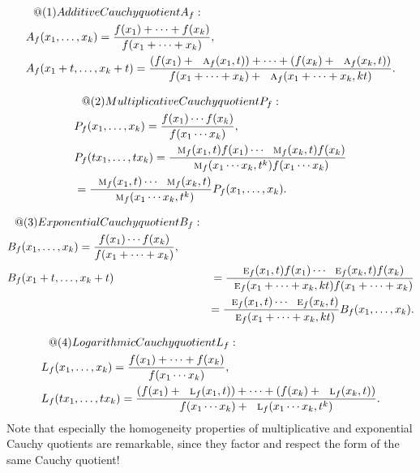 \documentclass{amsart}
\makeatletter
\theoremstyle{plain}
\numberwithin{equation}{section}
\def\RIfM@{\relax\ifmmode}%
\def\RIfM@{\relax\protect\ifmmode}
\def\text{\RIfM@\expandafter\text@\else\expandafter\mbox\fi}
\def\text@#1{\mathchoice
   {\textdef@\displaystyle\f@size{#1}}%
   {\textdef@\textstyle\tf@size{\firstchoice@false #1}}%
   {\textdef@\textstyle\sf@size{\firstchoice@false #1}}%
   {\textdef@\textstyle \ssf@size{\firstchoice@false #1}}%
   \glb@settings}
\def\textdef@#1#2#3{\hbox{{%
                    \everymath{#1}%
                    \let\f@size#2\selectfont
                    #3}}}
\newif\iffirstchoice@
\newcommand{\eh}{\textsc{e}}
\makeatother
\begin{document}
\medskip

\begin{align*}
&\text{(1) Additive Cauchy quotient } A_f: \\
&A_f(x_1, \ldots, x_k) = \frac{f(x_1) + \cdots + f(x_k)}{f(x_1 + \cdots + x_k)}, \\
&A_f(x_1 + t, \ldots, x_k + t) = \frac{(f(x_1) + \textsc{a}_f(x_1,t)) + \cdots + (f(x_k) + \textsc{a}_f(x_k,t))}
       {f(x_1 + \cdots + x_k) + \textsc{a}_f(x_1 + \cdots + x_k, k t)}.
\end{align*}

\medskip

\begin{align*}
&\text{(2) Multiplicative Cauchy quotient } P_f: \\
&P_f(x_1, \ldots, x_k) = \frac{f(x_1) \cdots f(x_k)}{f(x_1 \cdots x_k)}, \\
&P_f(t x_1, \ldots, t x_k) = \frac{\textsc{m}_f(x_1, t) f(x_1) \cdots \textsc{m}_f(x_k, t) f(x_k)}{\textsc{m}_f(x_1 \cdots x_k, t^k) f(x_1 \cdots x_k)} \\
&= \frac{\textsc{m}_f(x_1,t) \cdots \textsc{m}_f(x_k,t)}{\textsc{m}_f(x_1 \cdots x_k, t^k)} P_f(x_1, \ldots, x_k).
\end{align*}

\medskip

\begin{align*}
&\text{(3) Exponential Cauchy quotient } B_f: \\
&B_f(x_1, \ldots, x_k) = \frac{f(x_1) \cdots f(x_k)}{f(x_1 + \cdots + x_k)}, \\
&B_f(x_1 + t, \ldots, x_k + t) &= \frac{\eh_f(x_1,t) f(x_1) \cdots \eh_f(x_k,t) f(x_k)}{\eh_f(x_1 + \cdots + x_k, k t) f(x_1 + \cdots + x_k)} \\
&\quad &= \frac{\eh_f(x_1,t) \cdots \eh_f(x_k,t)}{\eh_f(x_1 + \cdots + x_k, k t)} B_f(x_1, \ldots, x_k).
\end{align*}

\medskip

\begin{align*}
&\text{(4) Logarithmic Cauchy quotient } L_f: \\
&L_f(x_1, \ldots, x_k) = \frac{f(x_1) + \cdots + f(x_k)}{f(x_1 \cdots x_k)}, \\
&L_f(t x_1, \ldots, t x_k) = \frac{(f(x_1) + \textsc{l}_f(x_1,t)) + \cdots + (f(x_k) + \textsc{l}_f(x_k,t))}
       {f(x_1 \cdots x_k) + \textsc{l}_f(x_1 \cdots x_k, t^k)}.
\end{align*}
%
Note that especially the homogeneity properties of multiplicative and exponential Cauchy quotients are remarkable,
since they factor and respect the form of the same Cauchy quotient!
\end{document}
